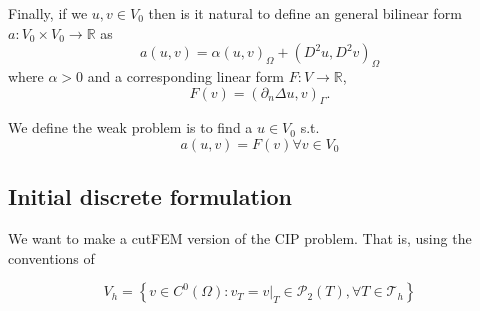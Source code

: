     Finally, if we $u,v \in V_{0}$ then is it natural to define an general bilinear form $ a: V_{0} \times  V_{0} \to   \mathbb{R} $ as \[
    a( u,v) = \alpha ( u,v)_{\Omega } + ( D^2u, D^2v)_{\Omega }
    \]
    where $\alpha >0$ and a corresponding linear form $F: V \to \mathbb{R} $,
    \[
    F( v) = ( \partial _{n} \Delta u ,v)_{\Gamma }.
    \]

    We define the weak problem is to find a $u \in  V_{0}$ s.t. \[
    a( u,v) = F(v) \forall v \in V_{0}
    \]




\subsection{Initial discrete formulation}%
\label{sub:initial_discrete_formulation}



We want to make a cutFEM version of the CIP problem. That is, using the conventions of

\[
V_{h} = \left\{ v \in C^{0}\left( \Omega  \right): v_{T} = v | _{T} \in \mathcal{P} _{2}\left( T \right), \forall T \in
\mathcal{T}_{h}    \right\}
\]



